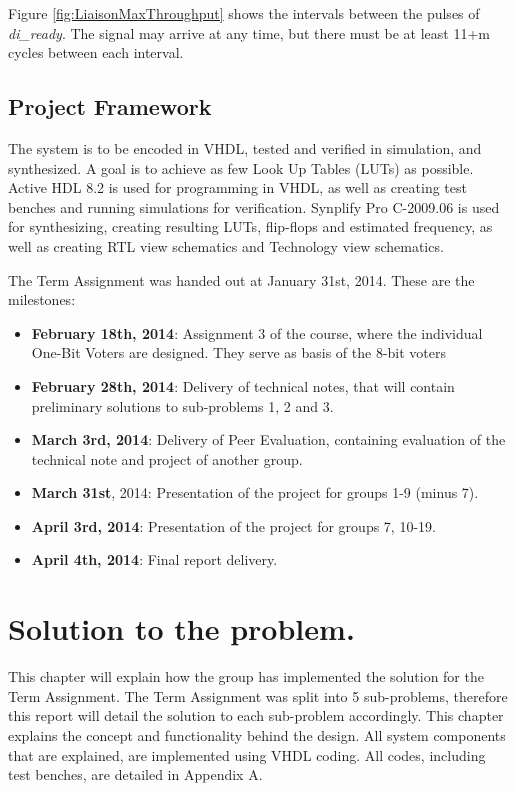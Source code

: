 \documentclass[a4paper]{IEEEtran}
\begin{document}
Figure \ref{fig:LiaisonMaxThroughput} shows the intervals between the pulses of \textit{di\_ready}. The signal may arrive at any time, but there must be at least 11+m cycles between each interval.

\subsection{Project Framework}
The system is to be encoded in VHDL, tested and verified in simulation, and synthesized. A goal is to achieve as few Look Up Tables (LUTs) as possible.
Active HDL 8.2 is used for programming in VHDL, as well as creating test benches and running simulations for verification.
Synplify Pro C-2009.06 is used for synthesizing, creating resulting LUTs, flip-flops and estimated frequency, as well as creating RTL view schematics and Technology view schematics. 

\indent The Term Assignment was handed out at January 31st, 2014.
These are the milestones\protect\cite{assignment-text}:
\begin{itemize}
    \item \textbf{February 18th, 2014}: Assignment 3\protect\cite{assignment-3} of the course, where the individual One-Bit Voters are designed. They serve as basis of the 8-bit voters
    \item \textbf{February 28th, 2014}: Delivery of technical notes, that will contain preliminary solutions to sub-problems 1, 2 and 3.
    \item \textbf{March 3rd, 2014}: Delivery of Peer Evaluation, containing evaluation of the technical note and project of another group.
    \item \textbf{March 31st}, 2014: Presentation of the project for groups 1-9 (minus 7).
    \item \textbf{April 3rd, 2014}: Presentation of the project for groups 7, 10-19.
    \item \textbf{April 4th, 2014}: Final report delivery.
\end{itemize}


\section{ Solution to the problem.}
This chapter will explain how the group has implemented the solution for the Term Assignment\protect\cite{assignment-text}.
The Term Assignment\protect\cite{assignment-text} was split into 5 sub-problems, therefore this report will detail the solution to each sub-problem accordingly.
This chapter explains the concept and functionality behind the design.
All system components that are explained, are implemented using VHDL coding.
All codes, including test benches, are detailed in Appendix A.
\end{document}
